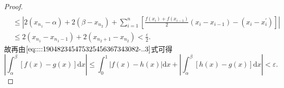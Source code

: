 \documentclass[../../main.tex]{subfiles}%
\begin{document}
\begin{proof}
\begin{align*}
\\
&\leqslant \left| 2\left( x_{n_1}-\alpha \right) +2\left( \beta -x_{n_2} \right) +\sum_{i=1}^n{\left[ \frac{f\left( x_i \right) +f\left( x_{i-1} \right)}{2}\left( x_i-x_{i-1} \right) -\left( x_i-x_{i}^{\prime} \right) \right]} \right|
\\
&\leqslant 2\left( x_{n_1}-x_{n_1-1} \right) +2\left( x_{n_2+1}-x_{n_2} \right) <\frac{\varepsilon}{2}.
\end{align*}
故再由\(\eqref{eq::::190482345475325456367343082-..3}\)式可得
\[
\left| \int_{\alpha}^{\beta} \left[ f(x) - g(x) \right] \mathrm{d}x \right| \leqslant \int_0^1 \left| f(x) - h(x) \right| \mathrm{d}x + \left| \int_{\alpha}^{\beta} \left[ h(x) - g(x) \right] \mathrm{d}x \right| < \varepsilon.
\]
\end{proof}
\end{document}
